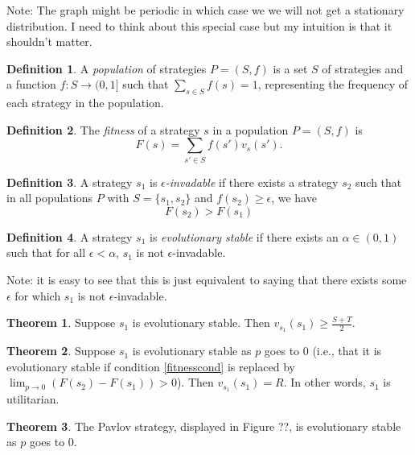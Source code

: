 \documentclass[11pt]{amsart}
\theoremstyle{definition}
\newtheorem{definition}{Definition}
\newtheorem{theorem}{Theorem}
\theoremstyle{remark}
\begin{document}
Note: The graph might be periodic in which case we we will not get a stationary distribution. I need to think about this special case but my intuition is that it shouldn't matter.

\begin{definition}
  A \textit{population} of strategies $P = (S, f)$ is a set $S$ of strategies and a function $f : S \to (0,1]$ such that $\sum_{s \in S} f(s) = 1$, representing the frequency of each strategy in the population.
\end{definition}

\begin{definition}
  The \textit{fitness} of a strategy $s$ in a population $P = (S, f)$ is \begin{equation*}
    F(s) = \sum_{s' \in S} f(s') v_s(s').
  \end{equation*}
\end{definition}

\begin{definition}
  A strategy $s_1$ is \textit{$\epsilon$-invadable} if there exists a strategy $s_2$ such that in all populations $P$ with $S = \{s_1,s_2\}$ and $f(s_2) \geq \epsilon$, we have \begin{equation}
    \label{fitnesscond}
    F(s_2) > F(s_1)
  \end{equation}
\end{definition}

\begin{definition}
  A strategy $s_1$ is \textit{evolutionary stable} if there exists an $\alpha \in (0,1)$ such that for all $\epsilon < \alpha$, $s_1$ is not $\epsilon$-invadable.
\end{definition}

Note: it is easy to see that this is just equivalent to saying that there exists some $\epsilon$ for which $s_1$ is not $\epsilon$-invadable.

\begin{theorem}
  Suppose $s_1$ is evolutionary stable. Then $v_{s_1}(s_1) \geq \frac{S + T}{2}$.
\end{theorem}

\begin{theorem}
  Suppose $s_1$ is evolutionary stable as $p$ goes to 0 (i.e., that it is evolutionary stable if condition \ref{fitnesscond} is replaced by $\lim_{p \to 0} (F (s_2)-F(s_1)) > 0$). Then $v_{s_1}(s_1) = R$. In other words, $s_1$ is utilitarian.
\end{theorem}

\begin{theorem}
  The Pavlov strategy, displayed in Figure ??, is evolutionary stable as $p$ goes to 0.
\end{theorem}
\end{document}
